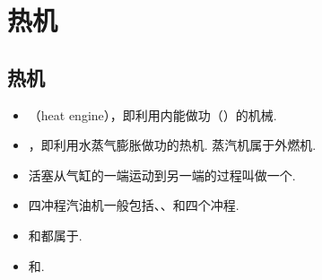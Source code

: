 \newpage
\section{热机}

\subsection{热机}
\vspace{10pt}
\begin{itemize}
\item {}（heat engine），即利用内能做功（）的机械.
\item {}，即利用水蒸气膨胀做功的热机. 蒸汽机属于外燃机.
\item 活塞从气缸的一端运动到另一端的过程叫做一个.
\item 四冲程汽油机一般包括、、和四个冲程.
\item {}和都属于.
\item {}和.
\end{itemize}